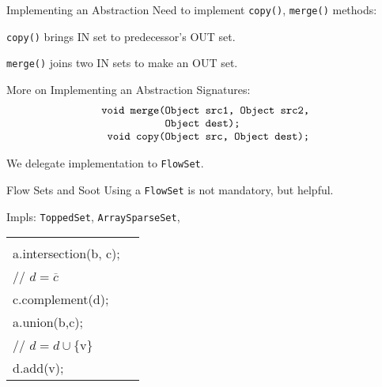\begin{slide}{Implementing an Abstraction}
\vspace*{-0.2in}
Need to implement {\tt copy()}, {\tt merge()} methods:
\begin{center}

\end{center}
{\tt copy()} brings IN set to predecessor's OUT set.

\begin{center}

\end{center}
{\tt merge()} joins two IN sets to make an OUT set.
\end{slide}

\begin{slide}{More on Implementing an Abstraction}
Signatures:
{\small 
\[ \mbox{\tt \begin{tabular}{r@{}l}
                 void merge(&Object src1, Object src2,\\
                            &Object dest);\\
                 void copy(&Object src, Object dest);
\end{tabular}}\]
}

We delegate implementation to {\tt FlowSet}.
\end{slide}

\begin{slide}{Flow Sets and Soot}
\vspace*{-0.1in}
Using a {\tt FlowSet} is not mandatory, but helpful.

\quad

Impls: {\tt ToppedSet}, {\tt ArraySparseSet}, \\
\qquad {}

\quad

\begin{tabular}{ll}
\begin{minipage}{0.5\textwidth}
{\small \tt 
// $c = a \cap b$ \\
a.intersection(b, c); \\

// $d = \overline{c}$\\
c.complement(d);
}
\end{minipage} &
\begin{minipage}{0.3\textwidth}
{\small \tt
// $c = a \cup b$ \\
a.union(b,c);\\

// $d = d \cup \{ \mbox{v} \}$\\
d.add(v);
}
\end{minipage}

\end{tabular}

\quad


\end{slide}

